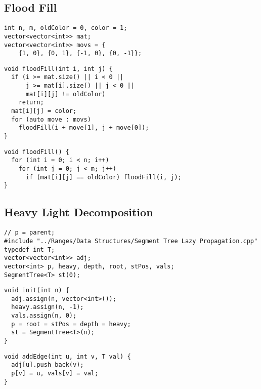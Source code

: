 \documentclass[twoside]{article}
\begin{document}
\begin{multicols*}{2}
\subsectionfont{\large\bfseries\sffamily\underline}
\subsection*{Flood Fill}
\begin{verbatim}
int n, m, oldColor = 0, color = 1;
vector<vector<int>> mat;
vector<vector<int>> movs = {
    {1, 0}, {0, 1}, {-1, 0}, {0, -1}};
\end{verbatim}
\vspace{-12pt}
\begin{verbatim}
void floodFill(int i, int j) {
  if (i >= mat.size() || i < 0 ||
      j >= mat[i].size() || j < 0 ||
      mat[i][j] != oldColor)
    return;
  mat[i][j] = color;
  for (auto move : movs)
    floodFill(i + move[1], j + move[0]);
}
\end{verbatim}
\vspace{-12pt}
\begin{verbatim}
void floodFill() {
  for (int i = 0; i < n; i++)
    for (int j = 0; j < m; j++)
      if (mat[i][j] == oldColor) floodFill(i, j);
}
\end{verbatim}

\subsectionfont{\large\bfseries\sffamily\underline}
\subsection*{Heavy Light Decomposition}
\begin{verbatim}
// p = parent;
#include "../Ranges/Data Structures/Segment Tree Lazy Propagation.cpp"
typedef int T;
vector<vector<int>> adj;
vector<int> p, heavy, depth, root, stPos, vals;
SegmentTree<T> st(0);
\end{verbatim}
\vspace{-12pt}
\begin{verbatim}
void init(int n) {
  adj.assign(n, vector<int>());
  heavy.assign(n, -1);
  vals.assign(n, 0);
  p = root = stPos = depth = heavy;
  st = SegmentTree<T>(n);
}
\end{verbatim}
\vspace{-12pt}
\begin{verbatim}
void addEdge(int u, int v, T val) {
  adj[u].push_back(v);
  p[v] = u, vals[v] = val;
}


\end{verbatim}
\end{multicols*}
\end{document}
